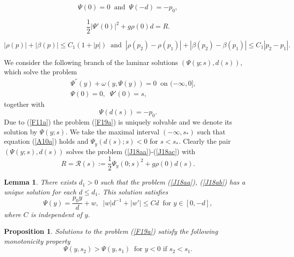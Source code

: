 \documentclass[10pt,a4paper]{amsart}
\newtheorem{lemma}{Lemma}
\newtheorem{proposition}{Proposition}
\begin{document}
\begin{equation}\label{J18ab}
\Psi(0)=0\;\;\mbox{and}\;\;\Psi(-d)=-p_0,
\end{equation}

\begin{equation}\label{J18ac}
\frac{1}{2}|\Psi'(0)|^2+g\rho(0)d=R.
\end{equation}

\begin{equation}\label{F11a}
|\rho(p)|+|\beta(p)|\leq C_1(1+|p|)\;\;\mbox{and}\;\;|\rho(p_2)-\rho(p_1)|+|\beta(p_2)-\beta(p_1)|\leq C_1|p_2-p_1|.
\end{equation}

We consider the following branch of the laminar solutions $(\Psi(y;s),d(s))$, which solve the problem
\begin{eqnarray}\label{F19a}
&&\Psi^{''}(y)+\omega(y,\Psi(y))=0\;\;\mbox{on $(-\infty,0]$},\nonumber\\
&&\Psi(0)=0,\;\;\Psi'(0)=s,
\end{eqnarray}
together with
\begin{equation}\label{A10a}
\Psi(d(s))=-p_0.
\end{equation}
Due to (\ref{F11a}) the problem (\ref{F19a}) is uniquely solvable and we denote its solution by $\Psi(y;s)$. We take the maximal interval $(-\infty,s_*)$ such that equation (\ref{A10a}) holds and $\Psi_y(d(s);s)<0$ for $s<s_*$. Clearly the pair $(\Psi(y;s),d(s))$ solves the problem (\ref{J18aa})-(\ref{J18ac}) with
\begin{equation}\label{A17a}
R={\mathcal R}(s):=\frac{1}{2}\Psi_y(0;s)^2+g\rho(0)d(s).
\end{equation}

\begin{lemma}\label{LemF11a} There exists $d_1>0$ such that the problem (\ref{J18aa}), (\ref{J18ab})
has a unique solution for each $d\leq d_1$. This solution satisfies
\begin{equation}\label{F11aa}
\Psi(y)=\frac{p_0y}{d}+w,\;\;|w|d^{-1}+|w'|\leq Cd\;\;\mbox{for $y\in [0,-d]$},
\end{equation}
where $C$ is independent of $y$.

\end{lemma}

\begin{proposition}\label{PM1a} Solutions to the problem (\ref{F19a}) satisfy the following monotonicity property
\begin{equation}\label{F7b}
\Psi(y,s_2)>\Psi(y,s_1)\;\;\mbox{for $y<0$ if $s_2<s_1$}.
\end{equation}
\end{proposition}
\end{document}
